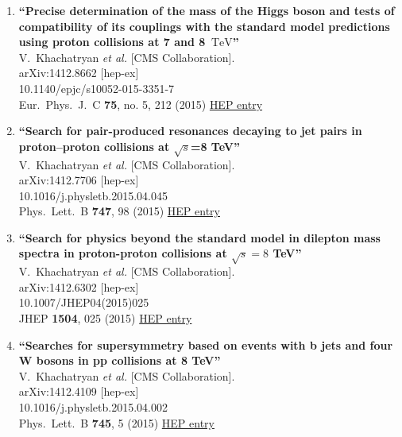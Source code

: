 \documentclass{article}
\begin{document}
\begin{enumerate}
\item%
{\bf ``Precise determination of the mass of the Higgs boson and tests of compatibility of its couplings with the standard model predictions using proton collisions at 7 and 8 $\,\text {TeV}$''}
  \\{}V.~Khachatryan {\it et al.} [CMS Collaboration].
  \\{}arXiv:1412.8662 [hep-ex]
    \\{}10.1140/epjc/s10052-015-3351-7
\\{}Eur.\ Phys.\ J.\ C {\bf 75}, no. 5, 212 (2015) %
\href{http://inspirehep.net/record/1335811}{HEP entry}


\item%
{\bf ``Search for pair-produced resonances decaying to jet pairs in proton–proton collisions at $\sqrt{s}$=8 TeV''}
  \\{}V.~Khachatryan {\it et al.} [CMS Collaboration].
  \\{}arXiv:1412.7706 [hep-ex]
    \\{}10.1016/j.physletb.2015.04.045
\\{}Phys.\ Lett.\ B {\bf 747}, 98 (2015) %
\href{http://inspirehep.net/record/1335501}{HEP entry}


\item%
{\bf ``Search for physics beyond the standard model in dilepton mass spectra in proton-proton collisions at $ \sqrt{s}=8 $ TeV''}
  \\{}V.~Khachatryan {\it et al.} [CMS Collaboration].
  \\{}arXiv:1412.6302 [hep-ex]
    \\{}10.1007/JHEP04(2015)025
\\{}JHEP {\bf 1504}, 025 (2015) %
\href{http://inspirehep.net/record/1335131}{HEP entry}


\item%
{\bf ``Searches for supersymmetry based on events with b jets and four W bosons in pp collisions at 8 TeV''}
  \\{}V.~Khachatryan {\it et al.} [CMS Collaboration].
  \\{}arXiv:1412.4109 [hep-ex]
    \\{}10.1016/j.physletb.2015.04.002
\\{}Phys.\ Lett.\ B {\bf 745}, 5 (2015) %
\href{http://inspirehep.net/record/1334141}{HEP entry}



\end{enumerate}
\end{document}
